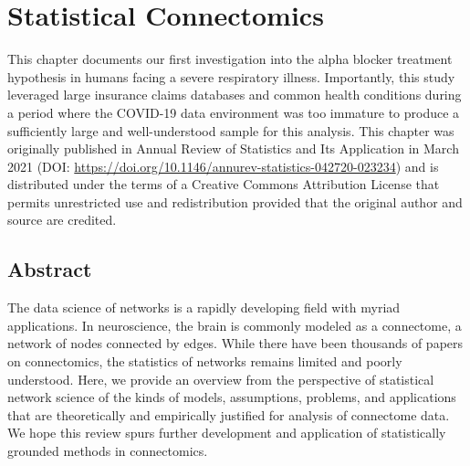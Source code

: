 \chapter{Statistical Connectomics} \label{chap:chap-3}

This chapter documents our first investigation into the alpha blocker treatment hypothesis in humans facing a severe respiratory illness. Importantly, this study leveraged large insurance claims databases and common health conditions during a period where the COVID-19 data environment was too immature to produce a sufficiently large and well-understood sample for this analysis. This chapter was originally published in Annual Review of Statistics and Its Application in March 2021 (DOI: \url{https://doi.org/10.1146/annurev-statistics-042720-023234}) and is distributed under the terms of a Creative Commons Attribution License that permits unrestricted use and redistribution provided that the original author and source are credited.

\pagebreak
\section*{Abstract}
The data science of networks is a rapidly developing field with myriad applications.  In neuroscience, the brain is commonly modeled as a connectome, a network of nodes connected by edges. While there have been thousands of papers on connectomics, the statistics of networks remains limited and poorly understood.  Here, we provide an overview from the perspective of statistical network science of the kinds of models, assumptions, problems, and applications that are theoretically and empirically justified for analysis of connectome data.  We hope this review spurs further development and application of statistically grounded methods in connectomics.
\pagebreak










